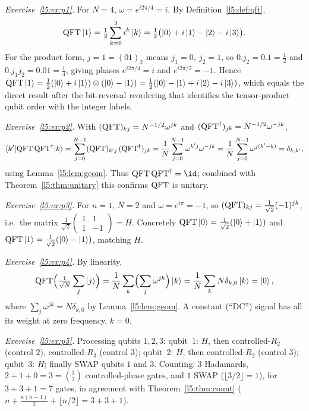 \begin{solution}
\textit{Exercise~\ref{l5:ex:p1}.} For $N=4$, $\omega=e^{i2\pi/4}=i$. By
Definition~\ref{l5:def:qft},
\[
  \mathrm{QFT}\ket{1} = \tfrac12\sum_{k=0}^{3} i^{k}\ket{k}
   = \tfrac12\bigl(\ket{0}+i\ket{1}-\ket{2}-i\ket{3}\bigr).
\]
For the product form, $j=1=(01)_2$ means $j_1=0,\ j_2=1$, so $0.j_2 = 0.1 =
\tfrac12$ and $0.j_1 j_2 = 0.01 = \tfrac14$, giving phases
$e^{i2\pi/4}=i$ and $e^{i2\pi/2}=-1$. Hence
$\mathrm{QFT}\ket{1} = \tfrac12(\ket{0}+i\ket{1})\otimes(\ket{0}-\ket{1})
= \tfrac12(\ket{0}-\ket{1}+i\ket{2}-i\ket{3})$, which equals the direct result
after the bit-reversal reordering that identifies the tensor-product qubit order
with the integer labels.

\medskip
\textit{Exercise~\ref{l5:ex:p2}.} With $(\mathrm{QFT})_{kj}=N^{-1/2}\omega^{jk}$ and
$(\mathrm{QFT}^{\dagger})_{jk}=N^{-1/2}\omega^{-jk}$,
\[
  \braket{k'|\mathrm{QFT}\,\mathrm{QFT}^{\dagger}|k}
   = \sum_{j=0}^{N-1}(\mathrm{QFT})_{k'j}\,(\mathrm{QFT}^{\dagger})_{jk}
   = \frac{1}{N}\sum_{j=0}^{N-1}\omega^{k'j}\omega^{-jk}
   = \frac{1}{N}\sum_{j=0}^{N-1}\omega^{j(k'-k)}
   = \delta_{k,k'},
\]
using Lemma~\ref{l5:lem:geom}. Thus $\QFT\,\QFT^{\dagger}=\id$; combined with
Theorem~\ref{l5:thm:unitary} this confirms $\mathrm{QFT}$ is unitary.

\medskip
\textit{Exercise~\ref{l5:ex:p3}.} For $n=1$, $N=2$ and $\omega=e^{i\pi}=-1$, so
$(\mathrm{QFT})_{kj}=\tfrac{1}{\sqrt2}(-1)^{jk}$, i.e.\ the matrix
$\tfrac{1}{\sqrt2}\left(\begin{smallmatrix}1&1\\1&-1\end{smallmatrix}\right)=H$.
Concretely $\mathrm{QFT}\ket{0}=\tfrac{1}{\sqrt2}(\ket0+\ket1)$ and
$\mathrm{QFT}\ket{1}=\tfrac{1}{\sqrt2}(\ket0-\ket1)$, matching $H$.

\medskip
\textit{Exercise~\ref{l5:ex:p4}.} By linearity,
\[
  \mathrm{QFT}\Bigl(\tfrac{1}{\sqrt N}\sum_{j} \ket{j}\Bigr)
   = \frac{1}{N}\sum_{k}\Bigl(\sum_{j}\omega^{jk}\Bigr)\ket{k}
   = \frac{1}{N}\sum_{k} N\delta_{k,0}\ket{k} = \ket{0},
\]
where $\sum_j \omega^{jk} = N\delta_{k,0}$ by Lemma~\ref{l5:lem:geom}. A constant
(``DC'') signal has all its weight at zero frequency, $k=0$.

\medskip
\textit{Exercise~\ref{l5:ex:p5}.} Processing qubits $1,2,3$:
qubit~$1$: $H$, then controlled-$R_2$ (control $2$), controlled-$R_3$ (control
$3$); qubit~$2$: $H$, then controlled-$R_2$ (control $3$); qubit~$3$: $H$;
finally SWAP qubits $1$ and $3$. Counting: $3$ Hadamards, $2+1+0 = 3 =
\binom{3}{2}$ controlled-phase gates, and $1$ SWAP ($\lfloor 3/2\rfloor = 1$),
for $3+3+1=7$ gates, in agreement with Theorem~\ref{l5:thm:count}
($n+\tfrac{n(n-1)}2+\lfloor n/2\rfloor = 3+3+1$).


\end{solution}
